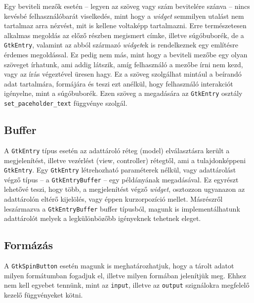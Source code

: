 Egy beviteli mezők esetén -- legyen az szöveg vagy szám bevitelére szánva -- nincs kevésbé felhasználóbarát viselkedés, mint hogy a \textit{widget} semmilyen utalást nem tartalmaz arra nézvést, mit is kellene voltaképp tartalmazni. Erre természetesen alkalmas megoldás az előző részben megismert címke, illetve súgóbuborék, de a \texttt{GtkEntry}, valamint az abból származó \textit{widget}ek is rendelkeznek egy említésre érdemes megoldással. Ez pedig nem más, mint hogy a beviteli mezőbe egy olyan szöveget írhatunk, ami addig látszik, amíg  felhasználó a mezőbe írni nem kezd, vagy az írás végeztével üresen hagy. Ez a szöveg szolgálhat mintául a beírandó adat tartalmára, formájára és teszi ezt anélkül, hogy felhasználó interakciót igényelne, mint a súgóbuborék. Ezen szöveg a megadására az \texttt{GtkEntry} osztály \texttt{set\_paceholder\_text} függvénye szolgál.

\subsection{Buffer}

A \texttt{GtkEntry} típus esetén az adattároló réteg (model) elválasztásra került a megjelenítést, illetve vezérlést (view, controller) rétegtől, ami a tulajdonképpeni \texttt{GtkEntry}. Egy \texttt{GtkEntry} létrehozható paraméterek nélkül, vagy adattárolást végző típus -- a \texttt{GtkEntryBuffer} -- egy példányának megadásával. Ez egyrészt lehetővé teszi, hogy több, a megjelenítést végző \textit{widget}, osztozzon ugyanazon az adattárolón eltérő kijelölés, vagy éppen kurzorpozíció mellet. Másrészről leszármazva a \texttt{GtkEntryBuffer} buffer típusból, magunk is implementálhatunk adattárolót melyek a legkülönbözőbb igényeknek tehetnek eleget.

\subsection{Formázás}

A \texttt{GtkSpinButton} esetén magunk is meghatározhatjuk, hogy a tárolt adatot milyen formátumban fogadjuk el, illetve milyen formában jelenítjük meg. Ehhez nem kell egyebet tennünk, mint az \texttt{input}, illetve az \texttt{output} szignálokra megfelelő kezelő függvényeket kötni.

